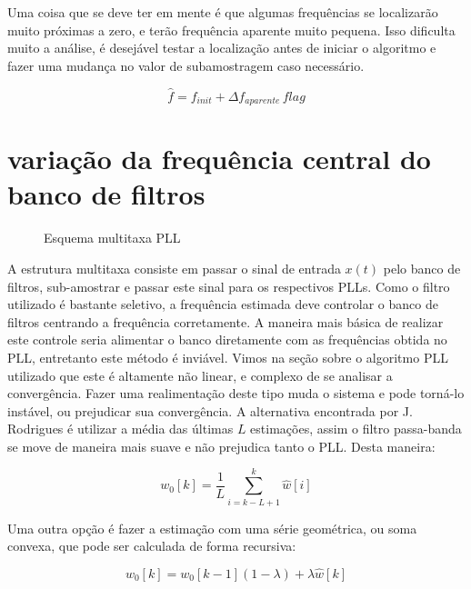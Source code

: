 \indent Uma coisa que se deve ter em mente é que algumas frequências se localizarão muito próximas a zero, e terão frequência aparente muito pequena. Isso dificulta muito a análise, é desejável testar a localização antes de iniciar o algoritmo e fazer uma mudança no valor de subamostragem caso necessário.

\begin{equation}
\hat{f}=f_{init}+\Delta f_{aparente}\, flag
\end{equation}

\section{variação da frequência central do banco de filtros}

\begin{figure}[h]
	\centering    
	\def\svgscale{0.7}
	
	\caption{Esquema multitaxa PLL}
	\label{fig:esquema_pll}
\end{figure}

\indent A estrutura multitaxa consiste em passar o sinal de entrada $x(t)$ pelo banco de filtros, sub-amostrar e passar este sinal para os respectivos PLLs. Como o filtro utilizado é bastante seletivo, a frequência estimada deve controlar o banco de filtros centrando a frequência corretamente. A maneira mais básica de realizar este controle seria alimentar o banco diretamente com as frequências obtida no PLL, entretanto este método é inviável. Vimos na seção sobre o algoritmo PLL utilizado que este é altamente não linear, e complexo de se analisar a convergência. Fazer uma realimentação deste tipo muda o sistema e pode torná-lo instável, ou prejudicar sua convergência. A alternativa encontrada por J. Rodrigues \cite{carvalho2008estimaccao}  é utilizar a média das últimas $L$ estimações, assim o filtro passa-banda se move de maneira mais suave e não prejudica tanto o PLL. Desta maneira:
   
\begin{equation}
w_0[k]=\frac{1}{L} \sum_{i=k-L+1}^{k}\hat{w}[i]
\end{equation}

\indent Uma outra opção é fazer a estimação com uma série geométrica, ou soma convexa, que pode ser calculada de forma recursiva:
 
\begin{equation}
w_{0}[k]=w_{0}[k-1](1-\lambda) + \lambda \hat{w}[k]
\label{eq:w0 filtro}
\end{equation}

